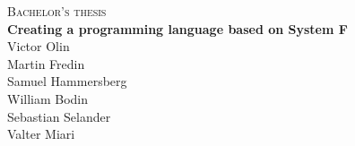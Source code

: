 \newpage
\restoregeometry
\thispagestyle{empty}
\mbox{}


\newpage
\thispagestyle{empty}
\begin{center}
	\textsc{\large Bachelor's thesis \the\year}\\[4cm]
	\textbf{\Large Creating a programming language based on System F} \\[1cm]
	{\large Victor Olin}\\[1mm]
	{\large Martin Fredin}\\[1mm]
	{\large Samuel Hammersberg}\\[1mm]
	{\large William Bodin}\\[1mm]
	{\large Sebastian Selander}\\[1mm]
	{\large Valter Miari}
	

\end{center}
